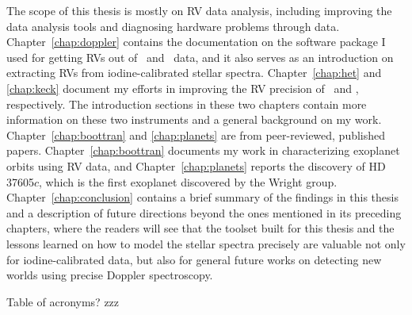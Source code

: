 The scope of this thesis is mostly on RV data analysis, including
improving the data analysis tools and diagnosing hardware problems
through data. Chapter~\ref{chap:doppler} contains the documentation on
the software package I used for getting RVs out of \het\ and \keck\
data, and it also serves as an introduction on extracting RVs from
iodine-calibrated stellar spectra. Chapter~\ref{chap:het} and
\ref{chap:keck} document my efforts in improving the RV precision of
\het\ and \keck, respectively. The introduction sections in these two
chapters contain more information on these two instruments and a
general background on my work. Chapter~\ref{chap:boottran} and
\ref{chap:planets} are from peer-reviewed, published
papers. Chapter~\ref{chap:boottran} documents my work in
characterizing exoplanet orbits using RV data, and
Chapter~\ref{chap:planets} reports the discovery of HD 37605$c$, which
is the first exoplanet discovered by the Wright
group. Chapter~\ref{chap:conclusion} contains a brief summary of the
findings in this thesis and a description of future directions beyond
the ones mentioned in its preceding chapters, where the readers will
see that the toolset built for this thesis and the lessons learned on
how to model the stellar spectra precisely are valuable not only for
iodine-calibrated data, but also for general future works on detecting
new worlds using precise Doppler spectroscopy.

Table of acronyms? zzz